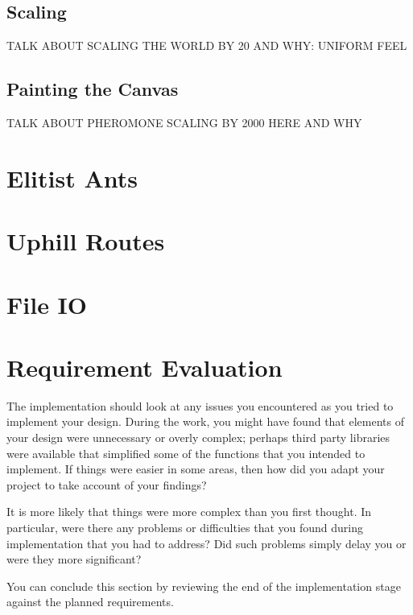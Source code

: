 \subsection{Scaling}

\Large TALK ABOUT SCALING THE WORLD BY 20 AND WHY: UNIFORM FEEL\normalsize






















\subsection{Painting the Canvas}

\Large TALK ABOUT PHEROMONE SCALING BY 2000 HERE AND WHY\normalsize

\section{Elitist Ants}

\section{Uphill Routes}

\section{File IO}

\section{Requirement Evaluation}

The implementation should look at any issues you encountered as you tried to implement your design. During the work, you might have found that elements of your design were unnecessary or overly complex; perhaps third party libraries were available that simplified some of the functions that you intended to implement. If things were easier in some areas, then how did you adapt your project to take account of your findings?

It is more likely that things were more complex than you first thought. In particular, were there any problems or difficulties that you found during implementation that you had to address? Did such problems simply delay you or were they more significant? 

You can conclude this section by reviewing the end of the implementation stage against the planned requirements. 


